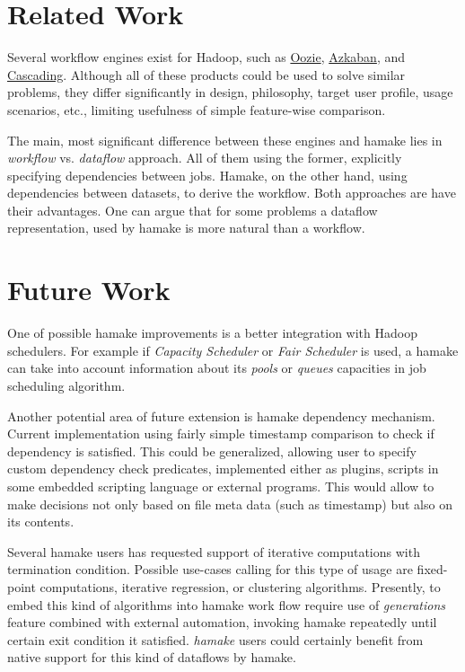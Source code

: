 \documentclass[10pt,conference,letterpaper]{IEEEtran}
\begin{document}
\section{Related Work}

Several workflow engines exist for Hadoop, such as
\href{http://github.com/tucu00/oozie1}{Oozie},
\href{http://sna-projects.com/azkaban/}{Azkaban}, and
\href{http://www.cascading.org/}{Cascading}.  Although all of these
products could be used to solve similar problems, they differ
significantly in design, philosophy, target user profile, usage
scenarios, etc., limiting usefulness of simple feature-wise
comparison.

The main, most significant difference between these engines and hamake
lies in \textit{workflow} vs. \textit{dataflow} approach. All of them
using the former, explicitly specifying dependencies between
jobs. Hamake, on the other hand, using dependencies between datasets,
to derive the workflow. Both approaches are have their advantages. One
can argue that for some problems a dataflow representation, used by
hamake is more natural than a workflow.

\section{Future Work}

One of possible hamake improvements is a better integration with
Hadoop schedulers. For example if \textit{Capacity Scheduler} or
\textit{Fair Scheduler} is used, a hamake can take into account
information about its \textit{pools} or \textit{queues} capacities in
job scheduling algorithm.

Another potential area of future extension is hamake dependency
mechanism. Current implementation using fairly simple timestamp
comparison to check if dependency is satisfied. This could be
generalized, allowing user to specify custom dependency check
predicates, implemented either as plugins, scripts in some embedded
scripting language or external programs. This would allow to make
decisions not only based on file meta data (such as timestamp) but
also on its contents.

Several hamake users has requested support of iterative computations
with termination condition. Possible use-cases calling for this type
of usage are fixed-point computations, iterative regression, or
clustering algorithms. Presently, to embed this kind of algorithms
into hamake work flow require use of \textit{generations} feature
combined with external automation, invoking hamake repeatedly until
certain exit condition it satisfied. \textit{hamake} users could
certainly benefit from native support for this kind of dataflows by
hamake.

\nocite{*}


\end{document}
